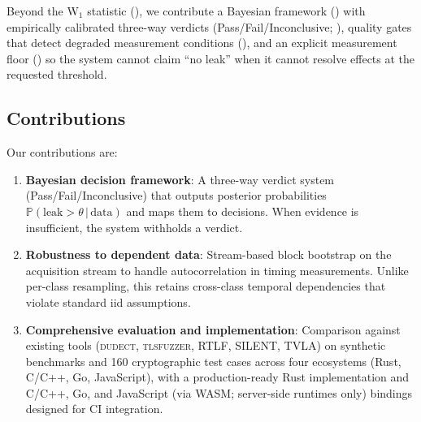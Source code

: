 \documentclass[letterpaper,twocolumn,10pt]{article}
\newcommand{\dudect}{\textsc{dudect}\xspace}
\newcommand{\tlsfuzzer}{\textsc{tlsfuzzer}\xspace}
\newcommand{\rtlf}{\textsc{RTLF}\xspace}
\newcommand{\silent}{\textsc{SILENT}\xspace}
\newcommand{\prob}[1]{\mathbb{P}(#1)}
\newcommand{\given}{\,|\,}
\begin{document}
Beyond the W$_1$ statistic (), we contribute a Bayesian
framework () with empirically calibrated three-way verdicts
(Pass/Fail/Inconclusive; ), quality gates that detect
degraded measurement conditions (), and an explicit measurement
floor () so the system cannot claim ``no leak'' when it
cannot resolve effects at the requested threshold.

\subsection{Contributions}
\label{sec:contributions}


Our contributions are:

\begin{enumerate}
    \item \textbf{Bayesian decision framework}: A three-way verdict system
          (Pass/Fail/Inconclusive) that outputs posterior probabilities
          $\prob{\text{leak} > \theta \given \text{data}}$ and maps them
          to decisions. When evidence is insufficient, the system withholds a verdict.

    \item \textbf{Robustness to dependent data}: Stream-based block bootstrap
          on the acquisition stream to handle autocorrelation in timing
          measurements. Unlike per-class resampling, this retains cross-class
          temporal dependencies that violate standard iid assumptions.

    \item \textbf{Comprehensive evaluation and implementation}: Comparison
          against existing tools (\dudect, \tlsfuzzer, \rtlf, \silent, TVLA) on
          synthetic benchmarks and 160 cryptographic test cases across four ecosystems
          (Rust, C/C++, Go, JavaScript), with a production-ready Rust implementation
          and C/C++, Go, and JavaScript (via WASM; server-side runtimes only) bindings
          designed for CI integration.
\end{enumerate}

\end{document}
